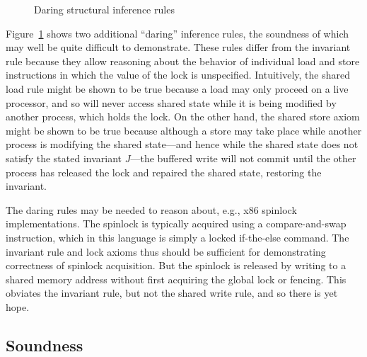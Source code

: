 \documentclass[11pt]{article}
\begin{document}
\begin{figure}[ht]
	\centering
	\caption{\label{fig:daring-structural-inference-rules}Daring structural inference rules}
\end{figure} 

Figure~\ref{fig:daring-structural-inference-rules} shows two additional ``daring'' inference rules, the soundness of which may well be quite difficult to demonstrate. These rules differ from the invariant rule because they allow reasoning about the behavior of individual load and store instructions in which the value of the lock is unspecified. Intuitively, the shared load rule might be shown to be true because a load may only proceed on a live processor, and so will never access shared state while it is being modified by another process, which holds the lock. On the other hand, the shared store axiom might be shown to be true because although a store may take place while another process is modifying the shared state---and hence while the shared state does not satisfy the stated invariant $J$---the buffered write will not commit until the other process has released the lock and repaired the shared state, restoring the invariant.

The daring rules may be needed to reason about, e.g., x86 spinlock implementations. The spinlock is typically acquired using a compare-and-swap instruction, which in this language is simply a locked if-the-else command. The invariant rule and lock axioms thus should be sufficient for demonstrating correctness of spinlock acquisition. But the spinlock is released by writing to a shared memory address without first acquiring the global lock or fencing. This obviates the invariant rule, but not the shared write rule, and so there is yet hope. 

\subsection{Soundness}
\end{document}
